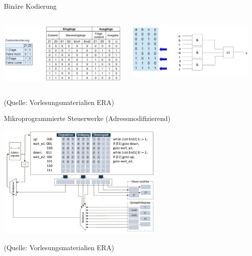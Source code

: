 \documentclass[
  german,            %
  aspectratio=169,    %
]{tumbeamer}
\begin{document}
\begin{frame}[c]{Binäre Kodierung}{}
  \begin{columns}[c]
		\begin{column}{0.5\textwidth}
      \begin{center}
        \includegraphics[width=\textwidth]{w09_bincode1_lv.png}
      \end{center}
    \end{column}
    \begin{column}{0.5\textwidth}
      \begin{center}
        \includegraphics[width=\textwidth]{w09_bincode2_lv.png}
      \end{center}
    \end{column}
  \end{columns}
  \vspace{0.5cm}
	\centering
	\tiny (Quelle: Vorlesungsmaterialien ERA)
\end{frame}

\begin{frame}[c]{Mikroprogrammierte Steuerwerke (Adressmodifizierend)}{}
	\begin{center}
		\includegraphics[width=0.62\textwidth]{w09_mikroprog_vl.png}
	\end{center}
	\centering
	\tiny (Quelle: Vorlesungsmaterialien ERA)
\end{frame}
\end{document}
